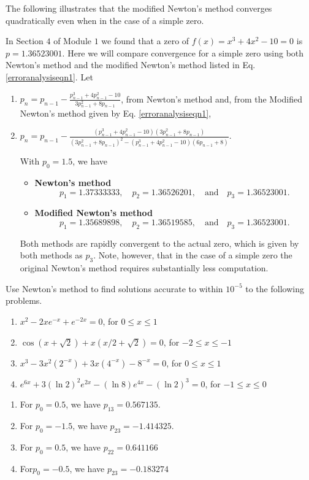 The following illustrates that the modified Newton’s method converges quadratically  even when in the case of a simple zero.
\begin{example}
In Section $4$ of Module $1$ we found that a zero of $f(x)=x^3+4x^2-10=0$ is $p=1.36523001$. Here we will compare convergence for a simple zero using both Newton’s method and the modified Newton’s method listed in Eq.\ref{erroranalysiseqn1}. Let
\begin{enumerate}[label=(\roman*)]
\item $\displaystyle p_n = p_{n-1}-\frac{p^3_{n-1}+4p^2_{n-1}-10}{3p^2_{n-1}+ 8p_{n-1}}$, from Newton’s method and, from the Modified Newton’s method given by Eq. \ref{erroranalysiseqn1},
\item $\displaystyle p_n = p_{n-1}-\frac{\left(p^3_{n-1}+4p^2_{n-1}-10\right)\left(3p^2_{n-1}+8p_{n-1}\right)}{\left(3p^2_{n-1}+8p_{n-1}\right)^2-\left(p^3_{n-1}+4p^2_{n-1}-10\right)\left(6p_{n-1}+8\right)}$.

With $p_0 = 1.5$, we have
\begin{itemize}
\item[] {\bf Newton's method}
\[ p_1=1.37333333,\quad p_2 = 1.36526201,\quad \mbox{and}\quad p_3 = 1.36523001.\]
\item[] {\bf Modified Newton's method}
\[p_1 = 1.35689898,\quad p_2 = 1.36519585,\quad \mbox{and}\quad p_3 = 1.36523001.\]
\end{itemize}
Both methods are rapidly convergent to the actual zero, which is given by both methods as $p_3$. Note, however, that in the case of a simple zero the original Newton’s method requires substantially less computation.
\end{enumerate}
\end{example}

\begin{myexercise}%
Use Newton’s method to find solutions accurate to within $10^{-5}$ to the following problems.
\begin{enumerate}[label=(\alph*)]
\item $x^2 -2xe^{-x} +e^{-2x} = 0$, for $0\leq x \leq1$
\item  $\cos(x + \sqrt{2})+x(x/2+\sqrt{2}) = 0$, for $-2 \leq x \leq-1$
\item $x^3 -3x^2(2^{-x}) + 3x(4^{-x}) - 8^{-x} = 0$, for $0 \leq x \leq 1$
\item $e^{6x} + 3(\ln2)^2e^{2x} - (\ln8)e^{4x} - (\ln2)^3 = 0$, for $-1 \leq x \leq 0$
\end{enumerate}
\begin{mysolution}
\begin{enumerate}[label=(\alph*)]
\item For $p_0=0.5$, we have $p_{13}=0.567135$.
\item For $p_0=-1.5$, we have $p_{23}=-1.414325$.
\item For $p_0=0.5$, we have $p_{22}=0.641166$
\item For$p_0=-0.5$, we have $p_{23}=-0.183274$
\end{enumerate}
\end{mysolution}
\end{myexercise}

